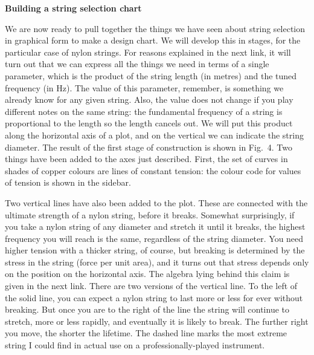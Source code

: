   \textbf{Building a string selection chart} 

  We are now ready to pull together the things we have seen about string 
  selection in graphical form to make a design chart. We will develop this in 
  stages, for the particular case of nylon strings. For reasons explained in 
  the next link, it will turn out that we can express all the things we need in 
  terms of a single parameter, which is the product of the string length (in 
  metres) and the tuned frequency (in Hz). The value of this parameter, 
  remember, is something we already know for any given string. Also, the value 
  does not change if you play different notes on the same string: the 
  fundamental frequency of a string is proportional to the length so the length 
  cancels out. We will put this product along the horizontal axis of a plot, 
  and on the vertical we can indicate the string diameter. The result of the 
  first stage of construction is shown in Fig.\ 4. Two things have been added 
  to the axes just described. First, the set of curves in shades of copper 
  colours are lines of constant tension: the colour code for values of tension 
  is shown in the sidebar. 


  Two vertical lines have also been added to the plot. These are connected with 
  the ultimate strength of a nylon string, before it breaks. Somewhat 
  surprisingly, if you take a nylon string of any diameter and stretch it until 
  it breaks, the highest frequency you will reach is the same, regardless of 
  the string diameter. You need higher tension with a thicker string, of 
  course, but breaking is determined by the stress in the string (force per 
  unit area), and it turns out that stress depends only on the position on the 
  horizontal axis. The algebra lying behind this claim is given in the next 
  link. There are two versions of the vertical line. To the left of the solid 
  line, you can expect a nylon string to last more or less for ever without 
  breaking. But once you are to the right of the line the string will continue 
  to stretch, more or less rapidly, and eventually it is likely to break. The 
  further right you move, the shorter the lifetime. The dashed line marks the 
  most extreme string I could find in actual use on a professionally-played 
  instrument. 


